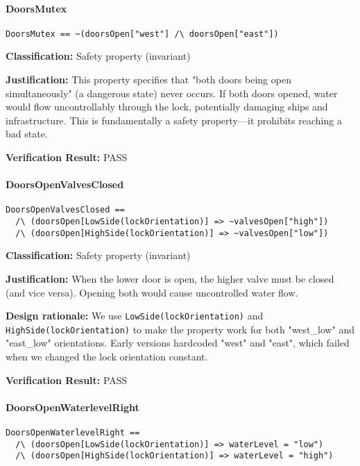 \documentclass[12pt,a4paper]{article}
\begin{document}
\paragraph{DoorsMutex}
\begin{lstlisting}[style=tlaplus]
DoorsMutex == ~(doorsOpen["west"] /\ doorsOpen["east"])
\end{lstlisting}

\textbf{Classification:} Safety property (invariant)

\textbf{Justification:} This property specifies that "both doors being open simultaneously" (a dangerous state) never occurs. If both doors opened, water would flow uncontrollably through the lock, potentially damaging ships and infrastructure. This is fundamentally a safety property---it prohibits reaching a bad state.

\textbf{Verification Result:} \checkmark{} PASS

\paragraph{DoorsOpenValvesClosed}
\begin{lstlisting}[style=tlaplus]
DoorsOpenValvesClosed == 
  /\ (doorsOpen[LowSide(lockOrientation)] => ~valvesOpen["high"])
  /\ (doorsOpen[HighSide(lockOrientation)] => ~valvesOpen["low"])
\end{lstlisting}

\textbf{Classification:} Safety property (invariant)

\textbf{Justification:} When the lower door is open, the higher valve must be closed (and vice versa). Opening both would cause uncontrolled water flow.

\textbf{Design rationale:} We use \texttt{LowSide(lockOrientation)} and \texttt{HighSide(lockOrientation)} to make the property work for both "west\_low" and "east\_low" orientations. Early versions hardcoded "west" and "east", which failed when we changed the lock orientation constant.

\textbf{Verification Result:} \checkmark{} PASS

\paragraph{DoorsOpenWaterlevelRight}
\begin{lstlisting}[style=tlaplus]
DoorsOpenWaterlevelRight == 
  /\ (doorsOpen[LowSide(lockOrientation)] => waterLevel = "low")
  /\ (doorsOpen[HighSide(lockOrientation)] => waterLevel = "high")
\end{lstlisting}
\end{document}
